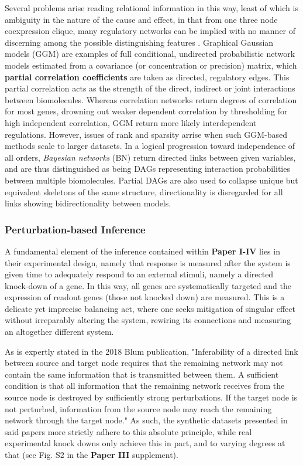 Several problems arise reading relational information in this way, least of which is ambiguity in the nature of the cause and effect, in that from one three node coexpression clique, many regulatory networks can be implied with no manner of discerning among the possible distinguishing features \citep{markowetz2007inferring}.
Graphical Gaussian models (GGM) are examples of full conditional, undirected probabilistic network models estimated from a covariance (or concentration or precision) matrix, which \textbf{partial correlation coefficients} are taken as directed, regulatory edges. This partial correlation acts as the strength of the direct, indirect or joint interactions between biomolecules. Whereas correlation networks return degrees of correlation for most genes, drowning out weaker dependent correlation by thresholding for high independent correlation, GGM return more likely interdependent regulations\citep{schafer2004empirical}. However, issues of rank and sparsity arrise when such GGM-based methods scale to larger datasets. In a logical progression toward independence of all orders, \emph{Bayesian networks} (BN) return directed links between given variables, and are thus distinguished as being DAGs representing interaction probabilities between multiple biomolecules. Partial DAGs are also used to collapse unique but equivalent skeletons of the same structure, \ie directionality is disregarded for all links showing bidirectionality between models.


\subsubsection{Perturbation-based Inference}
\label{sec:ODE}
A fundamental element of the inference contained within \textbf{Paper I-IV} lies in their experimental design, namely that response is measured after the system is given time to adequately respond to an external stimuli, namely a directed knock-down of a gene. In this way, all genes are systematically targeted and the expression of readout genes (those not knocked down) are measured. This is a delicate yet imprecise balancing act, where one seeks mitigation of singular effect without irreparably altering the system, rewiring its connections and measuring an altogether different system.

As is expertly stated in the 2018 Blum \etal publication, "Inferability of a directed link between source and target node requires that the remaining network may not contain the same information that is transmitted between them. A sufficient condition is that all information that the remaining network receives from the source node is destroyed by sufficiently strong perturbations. If the target node is not perturbed, information from the source node may reach the remaining network through the target node." \cite{blum2018experimental} As such, the synthetic datasets presented in said papers more strictly adhere to this absolute principle, while real experimental knock downs only achieve this in part, and to varying degrees at that (see Fig. S2 in the \textbf{Paper III} supplement).

